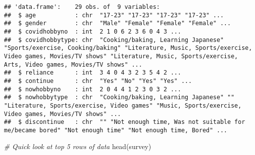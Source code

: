 \documentclass[
]{article}
\newenvironment{Shaded}{\begin{snugshade}}{\end{snugshade}}
\newcommand{\CommentTok}[1]{\textcolor[rgb]{0.56,0.35,0.01}{\textit{#1}}}
\newcommand{\ConstantTok}[1]{\textcolor[rgb]{0.00,0.00,0.00}{#1}}
\newcommand{\FunctionTok}[1]{\textcolor[rgb]{0.00,0.00,0.00}{#1}}
\newcommand{\NormalTok}[1]{#1}
\newcommand{\OtherTok}[1]{\textcolor[rgb]{0.56,0.35,0.01}{#1}}
\newcommand{\SpecialCharTok}[1]{\textcolor[rgb]{0.00,0.00,0.00}{#1}}
\newcommand{\StringTok}[1]{\textcolor[rgb]{0.31,0.60,0.02}{#1}}
\begin{document}
\begin{Shaded}
\end{Shaded}

\begin{verbatim}
## 'data.frame':    29 obs. of  9 variables:
##  $ age           : chr  "17-23" "17-23" "17-23" "17-23" ...
##  $ gender        : chr  "Male" "Female" "Female" "Female" ...
##  $ covidhobbyno  : int  2 1 0 6 2 3 6 0 4 3 ...
##  $ covidhobbytype: chr  "Cooking/baking, Learning Japanese" "Sports/exercise, Cooking/baking" "Literature, Music, Sports/exercise, Video games, Movies/TV shows" "Literature, Music, Sports/exercise, Arts, Video games, Movies/TV shows" ...
##  $ reliance      : int  3 4 0 4 3 2 3 5 4 2 ...
##  $ continue      : chr  "Yes" "No" "Yes" "Yes" ...
##  $ nowhobbyno    : int  2 0 4 4 1 2 3 0 3 2 ...
##  $ nowhobbytype  : chr  "Cooking/baking, Learning Japanese" "" "Literature, Sports/exercise, Video games" "Music, Sports/exercise, Video games, Movies/TV shows" ...
##  $ discontinue   : chr  "" "Not enough time, Was not suitable for me/became bored" "Not enough time" "Not enough time, Bored" ...
\end{verbatim}

\begin{Shaded}
\begin{Highlighting}[]
\CommentTok{\# Quick look at top 5 rows of data}
\FunctionTok{head}\NormalTok{(survey) }
\end{Highlighting}
\end{Shaded}
\end{document}
